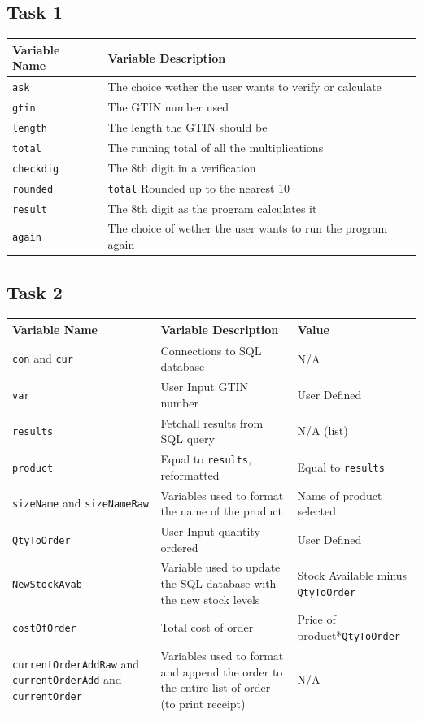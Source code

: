 \documentclass[a4paper]{article}
\begin{document}
\subsection{Task 1}
\begin{center}
\begin{tabular}{ | m{13em} | m{16em} | }
  \hline
  Variable Name & Variable Description	\\ [0.5ex] 
  \hline\hline
  \verb|ask| & The choice wether the user wants to verify or calculate \\
  \hline
  \verb|gtin| & The GTIN number used \\
  \hline
  \verb|length| & The length the GTIN should be \\
  \hline
  \verb|total| & The running total of all the multiplications \\
  \hline
  \verb|checkdig| & The 8th digit in a verification \\
  \hline
  \verb|rounded| & \verb|total| Rounded up to the nearest 10 \\ 
  \hline
  \verb|result| & The 8th digit as the program calculates it \\
  \hline
  \verb|again| & The choice of wether the user wants to run the program again \\
  \hline 
\end{tabular}
\end{center}

\subsection{Task 2}
\begin{center}
\begin{tabular}{ | m{13em} | m{16em}| m{14em} | } 
 \hline
 Variable Name & Variable Description & Value \\ [0.5ex] 
 \hline\hline
 \verb|con| and \verb|cur| & Connections to SQL database & N/A \\ 
 \hline
 \verb|var| & User Input GTIN number & User Defined \\
 \hline
 \verb|results| & Fetchall results from SQL query & N/A (list) \\
 \hline
 \verb|product| & Equal to \verb|results|, reformatted & Equal to \verb|results| \\
 \hline
 \verb|sizeName| and \verb|sizeNameRaw| & Variables used to format the name of the product & Name of product selected \\
 \hline
 \verb|QtyToOrder| & User Input quantity ordered & User Defined \\
 \hline
 \verb|NewStockAvab| & Variable used to update the SQL database with the new stock levels & Stock Available minus \verb|QtyToOrder| \\ 
 \hline
 \verb|costOfOrder| & Total cost of order & Price of product*\verb|QtyToOrder| \\
 \hline
 \verb|currentOrderAddRaw| and \verb|currentOrderAdd| and \verb|currentOrder| & Variables used to format and append the order to the entire list of order (to print receipt) & N/A \\ [1ex] 
 \hline
\end{tabular}
\end{center}
\end{document}
